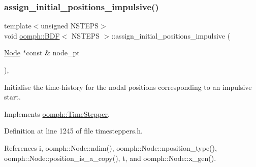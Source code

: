 \mbox{\label{classoomph_1_1BDF_a2506824a840f47d5d816b68f6144c7e7}} 
\subsubsection{\texorpdfstring{assign\+\_\+initial\+\_\+positions\+\_\+impulsive()}{assign\_initial\_positions\_impulsive()}}
{\footnotesize\ttfamily template$<$unsigned N\+S\+T\+E\+PS$>$ \\
void \hyperlink{classoomph_1_1BDF}{oomph\+::\+B\+DF}$<$ N\+S\+T\+E\+PS $>$\+::assign\+\_\+initial\+\_\+positions\+\_\+impulsive (\begin{DoxyParamCaption}\item[{\hyperlink{classoomph_1_1Node}{Node} $\ast$const \&}]{node\+\_\+pt }\end{DoxyParamCaption})\hspace{0.3cm}{\ttfamily [inline]}, {\ttfamily [virtual]}}



Initialise the time-\/history for the nodal positions corresponding to an impulsive start. 



Implements \hyperlink{classoomph_1_1TimeStepper_ab66972f0eaf3ba34645793e23e46afd5}{oomph\+::\+Time\+Stepper}.



Definition at line 1245 of file timesteppers.\+h.



References i, oomph\+::\+Node\+::ndim(), oomph\+::\+Node\+::nposition\+\_\+type(), oomph\+::\+Node\+::position\+\_\+is\+\_\+a\+\_\+copy(), t, and oomph\+::\+Node\+::x\+\_\+gen().

\mbox{\label{classoomph_1_1BDF_a569e571e8f96382bfa9cecd7abb05af4}} 
